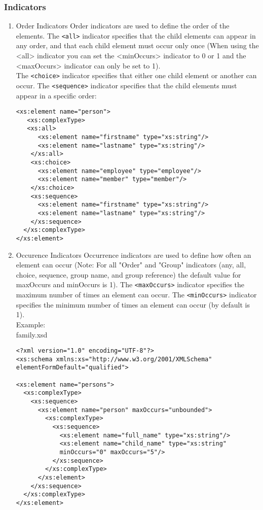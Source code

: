 \documentclass[11pt]{article}
\begin{document}
\subsubsection{Indicators}
\label{sec:org7878d4a}
\begin{enumerate}
\item Order Indicators
\label{sec:org0ee92e5}
Order indicators are used to define the order of the elements.
The \texttt{<all>} indicator specifies that the child elements can appear in any order, and that each child element must occur only once (When using the <all> indicator you can set the <minOccurs> indicator to 0 or 1 and the <maxOccurs> indicator can only be set to 1).\\
The \texttt{<choice>} indicator specifies that either one child element or another can occur. The \texttt{<sequence>} indicator specifies that the child elements must appear in a specific order:
\lstset{breaklines=true,language=XML,label= ,caption= ,captionpos=b,numbers=none}
\begin{lstlisting}
<xs:element name="person">
   <xs:complexType>
   <xs:all>
      <xs:element name="firstname" type="xs:string"/>
      <xs:element name="lastname" type="xs:string"/>
    </xs:all>
    <xs:choice>
      <xs:element name="employee" type="employee"/>
      <xs:element name="member" type="member"/>
    </xs:choice>
    <xs:sequence>
      <xs:element name="firstname" type="xs:string"/>
      <xs:element name="lastname" type="xs:string"/>
    </xs:sequence>
  </xs:complexType>
</xs:element>
\end{lstlisting}

\item Occurence Indicators
\label{sec:org74d7c98}
Occurrence indicators are used to define how often an element can occur (Note: For all "Order" and "Group" indicators (any, all, choice, sequence, group name, and group reference) the default value for maxOccurs and minOccurs is 1). The \texttt{<maxOccurs>} indicator specifies the maximum number of times an element can occur. The \texttt{<minOccurs>} indicator specifies the minimum number of times an element can occur (by default is 1).\\
Example:\\
family.xsd
\lstset{breaklines=true,language=XML,label= ,caption= ,captionpos=b,numbers=none}
\begin{lstlisting}
<?xml version="1.0" encoding="UTF-8"?>
<xs:schema xmlns:xs="http://www.w3.org/2001/XMLSchema"
elementFormDefault="qualified">

<xs:element name="persons">
  <xs:complexType>
    <xs:sequence>
      <xs:element name="person" maxOccurs="unbounded">
        <xs:complexType>
          <xs:sequence>
            <xs:element name="full_name" type="xs:string"/>
            <xs:element name="child_name" type="xs:string"
            minOccurs="0" maxOccurs="5"/>
          </xs:sequence>
        </xs:complexType>
      </xs:element>
    </xs:sequence>
  </xs:complexType>
</xs:element>


\end{lstlisting}
\end{enumerate}
\end{document}
